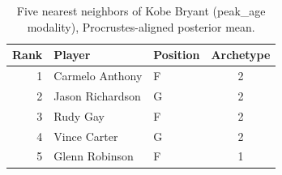\begin{table}[htbp]
  \centering\small
  \begin{tabular}{rllc}
    \toprule
    Rank & Player & Position & Archetype \\
    \midrule
    1 & Carmelo Anthony & F & 2 \\
    2 & Jason Richardson & G & 2 \\
    3 & Rudy Gay & F & 2 \\
    4 & Vince Carter & G & 2 \\
    5 & Glenn Robinson & F & 1 \\
    \bottomrule
  \end{tabular}
  \caption{Five nearest neighbors of Kobe Bryant (peak_age modality), Procrustes-aligned posterior mean.}
  \label{tab:Kobe_Bryant_neighbors_peak_age}
\end{table}

